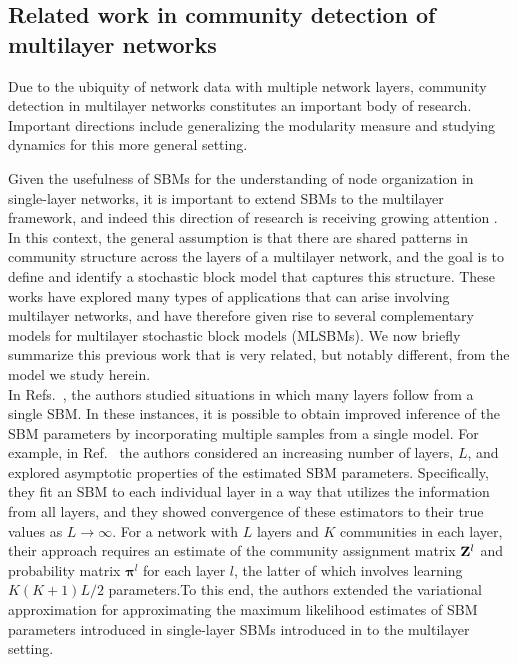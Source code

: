 \subsection{Related work in community detection of multilayer networks}
Due to the ubiquity of network data with multiple network layers, community detection in multilayer networks constitutes an important body of research. Important directions include generalizing the modularity measure \cite{muchamultislice} and studying dynamics \cite{manlio2} for this more general setting. 

Given the usefulness of SBMs for the understanding of node organization in single-layer networks, it is important to extend SBMs to the multilayer framework, and indeed this direction of research is receiving growing attention  \cite{airoldi,mlsbm1,barbillon,catala,thiagomlsbm}. In this context, the general assumption is that there are shared patterns in community structure across the layers of a multilayer network, and the goal is to define and identify a stochastic block model that captures this structure. These works have explored many types of applications that can arise involving multilayer networks,
%
and have therefore given rise to several complementary models for multilayer stochastic block models (MLSBMs). We now briefly summarize this previous work that is very related, but notably different, from the model we study herein.
%
\\\indent 
 In Refs.~\cite{airoldi,mlsbm1,barbillon}, the authors studied situations in which many layers follow from a single SBM. In these instances, it is possible to obtain improved inference of the SBM parameters by incorporating multiple samples from a single model. For example, in Ref.~\cite{airoldi} the authors considered an increasing number of layers, $L$, and explored asymptotic properties of the estimated SBM parameters. Specifically, they fit an SBM to each individual layer in a way that utilizes the information from all layers, and they showed convergence of these estimators to their true values as $L\to\infty$. %
For a network with $L$ layers and $K$ communities in each layer, their approach requires  an estimate of the community assignment matrix ${\bf Z}^l$ and probability matrix ${\boldsymbol \pi}^l$ for each layer $l$, the latter of which involves learning $K(K+1)L/2$ parameters.To this end, the authors extended the variational approximation for approximating the maximum likelihood estimates of SBM parameters introduced in single-layer SBMs introduced in \cite{dudin} to the multilayer setting.
